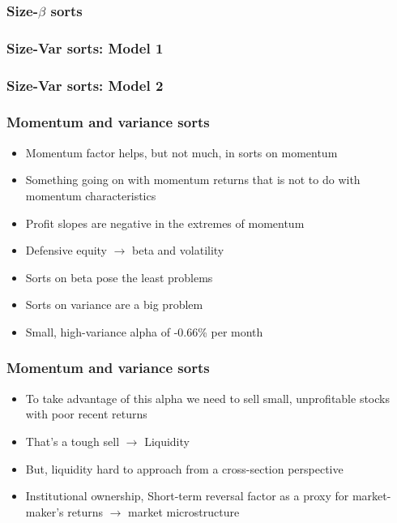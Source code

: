 \documentclass{beamer}
\begin{document}
\begin{frame}
  \frametitle{Size-$\beta$ sorts}
  \begin{center}
  \resizebox*{!}{\dimexpr\textheight-1.3cm\relax}{
    
    }
  \end{center}
\end{frame}

\begin{frame}
  \frametitle{Size-Var sorts: Model 1}
  \begin{center}
  \resizebox*{!}{\dimexpr\textheight-1.3cm\relax}{
    
    }
  \end{center}
\end{frame}

\begin{frame}
  \frametitle{Size-Var sorts: Model 2}
  \begin{center}
  \resizebox*{!}{\dimexpr\textheight-1.3cm\relax}{
    
    }
  \end{center}
\end{frame}

\begin{frame}
\frametitle{Momentum and variance sorts}
\begin{itemize}
    \item Momentum factor helps, but not much, in sorts on momentum
    \item Something going on with momentum returns that is not to do with
    momentum characteristics
    \item Profit slopes are negative in the extremes of momentum
    \item Defensive equity $\rightarrow$ beta and volatility
    \item Sorts on beta pose the least problems
    \item Sorts on variance are a big problem
    \item Small, high-variance alpha of -0.66\% per month
\end{itemize}
\end{frame}

\begin{frame}
\frametitle{Momentum and variance sorts}
\begin{itemize}
    \item To take advantage of this alpha we need to sell small,
    unprofitable stocks with poor recent returns
    \item That's a tough sell $\rightarrow$ Liquidity
    \item But, liquidity hard to approach from a cross-section perspective
    \item Institutional ownership, Short-term reversal factor as a proxy
    for market-maker's returns $\rightarrow$ market microstructure
\end{itemize}
\end{frame}
\end{document}
